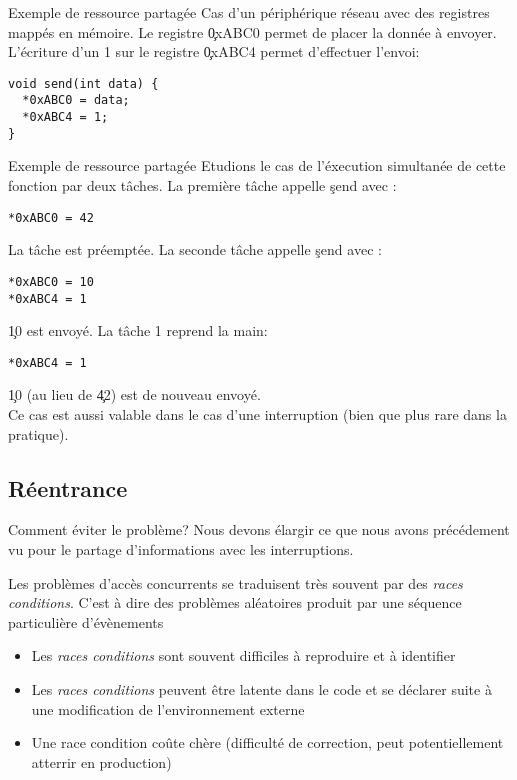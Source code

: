 \begin{frame}[fragile]{Exemple de ressource partagée}
  Cas d'un  périphérique réseau avec des registres  mappés en mémoire.
  Le  registre  \c{0xABC0}  permet  de  placer la  donnée  à  envoyer.
  L'écriture  d'un 1  sur  le registre  \c{0xABC4} permet  d'effectuer
  l'envoi:
\begin{lstlisting}
void send(int data) {
  *0xABC0 = data;
  *0xABC4 = 1;
}
  \end{lstlisting}
\end{frame}

\begin{frame}[fragile]{Exemple de ressource partagée}
  Etudions le cas de l'éxecution simultanée de cette fonction par deux
  tâches.  La première tâche appelle \c{send} avec :
  \begin{lstlisting}
*0xABC0 = 42
  \end{lstlisting}
  La  tâche est  préemptée.  La  seconde tâche  appelle  \c{send} avec
  :
\begin{lstlisting}
*0xABC0 = 10
*0xABC4 = 1
\end{lstlisting}
  \c{10} est envoyé. La tâche 1 reprend la main:
\begin{lstlisting}
*0xABC4 = 1
\end{lstlisting}
  \c{10} (au lieu de \c{42}) est de nouveau envoyé.\\[3mm]

  Ce cas  est aussi valable dans  le cas d'une  interruption (bien que
  plus rare dans la pratique).
\end{frame}

\subsection{Réentrance}

\begin{frame}{Comment éviter le problème?}
  Nous devons élargir ce que nous avons précédement vu pour le partage
  d'informations avec les interruptions.

  Les problèmes d'accès concurrents se traduisent très souvent par des
  \emph{races  conditions}.   C'est à  dire  des problèmes  aléatoires
  produit par une séquence particulière d'évènements
  \begin{itemize}
  \item   Les  \emph{races  conditions}   sont  souvent   difficiles  à
    reproduire et à identifier
  \item Les  \emph{races conditions} peuvent être latente  dans le code
    et se déclarer suite à une modification de l'environnement externe
  \item Une race condition coûte chère (difficulté de correction, peut
    potentiellement atterrir en production)
  \end{itemize}
\end{frame}

